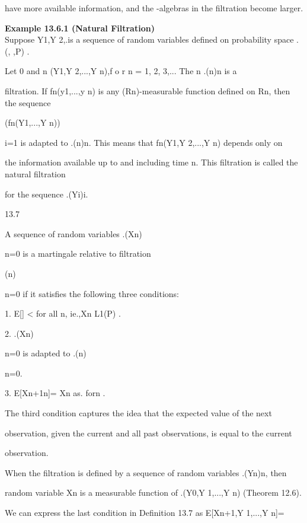 have more available information, and the \sigma-algebras in the filtration become larger.

\textbf{Example 13.6.1 (Natural Filtration)} \\

Suppose Y1,Y 2,.is a sequence of random variables defined on probability space .(\Omega, ,P) .

Let 0 \coloneqq {\emptyset,\Omega } and n \coloneqq \sigma(Y1,Y 2,...,Y n),f o r n = 1, 2, 3,... The n .(n)n is a

filtration. If fn(y1,...,y n) is any (Rn)-measurable function defined on Rn, then the sequence

(fn(Y1,...,Y n))\infty

i=1 is adapted to .(n)n. This means that fn(Y1,Y 2,...,Y n) depends only on

the information available up to and including time n. This filtration is called the natural filtration

for the sequence .(Yi)i.

\begin{defbox}{13.7}
\end{defbox}

A sequence of random variables .(Xn)\infty

n=0 is a martingale relative to filtration

(n)\infty

n=0 if it satisfies the following three conditions:

1. E[\vertXn\vert] < \infty for all n, ie.,Xn \in L1(P) .

2. .(Xn)\infty

n=0 is adapted to .(n)\infty

n=0.

3. E[Xn+1\vert{}n]= Xn as. forn .

The third condition captures the idea that the expected value of the next

observation, given the current and all past observations, is equal to the current

observation.

When the filtration is defined by a sequence of random variables .(Yn)n, then

random variable Xn is a measurable function of .(Y0,Y 1,...,Y n) (Theorem 12.6).

We can express the last condition in Definition 13.7 as E[Xn+1,Y 1,...,Y n]=

